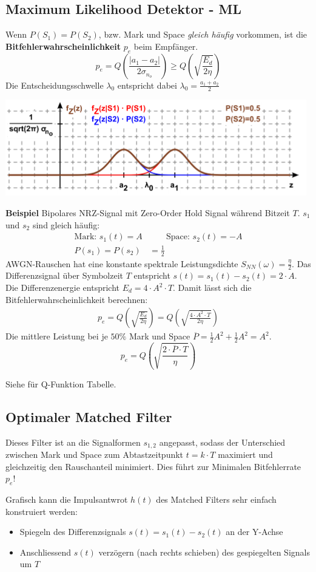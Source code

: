 \subsection{Maximum Likelihood Detektor - ML}
 Wenn $P(S_1) = P(S_2)$, bzw. Mark und Space \textit{gleich häufig} vorkommen, ist die \textbf{Bitfehlerwahrscheinlichkeit} $p_e$ beim Empfänger.
\[
p_e = Q\left(\frac{|a_1 - a_2|}{2\sigma_{n_o}}\right) \geq Q\left(\sqrt{\frac{E_d}{2\eta}}\right)
\]
Die Entscheidungsschwelle $\lambda_0$ entspricht dabei $\lambda_0 = \frac{a_1 + a_2}{2}$
\begin{center}
	\includegraphics[width=0.8\columnwidth]{Images/ml}
\end{center}
\noindent\textbf{Beispiel} Bipolares NRZ-Signal mit Zero-Order Hold Signal während Bitzeit $T$. $s_1$ und $s_2$ sind gleich häufig:\\
\begin{align*}
	\text{Mark: } s_1(t) = A &\qquad \text{Space: } s_2(t) = -A\\
	P(s_1) = P(s_2) &= \frac{1}{2}
\end{align*}
AWGN-Rauschen hat eine konstante spektrale Leistungsdichte $S_{NN}(\omega) = \frac{\eta}{2}$. Das Differenzsignal über Symbolzeit $T$ entspricht $s(t) = s_1(t) - s_2(t) = 2\cdot A$. Die Differenzenergie entspricht $E_d = 4\cdot A^2\cdot T$. Damit lässt sich die Bitfehlerwahrscheinlichkeit berechnen:
\begin{align*}
	p_e = Q\left(\sqrt{\frac{E_d}{2\eta}}\right) = Q\left(\sqrt{\frac{4\cdot A^2 \cdot T}{2\eta}}\right)
\end{align*}
Die mittlere Leistung bei je $50\%$ Mark und Space $\overline{P} = \frac{1}{2}A^2 + \frac{1}{2}A^2 = A^2$.
\[
p_e = Q\left(\sqrt{\frac{2\cdot \overline{P} \cdot T}{\eta}}\right)
\]

Siehe  für Q-Funktion Tabelle.

\subsection{Optimaler Matched Filter}
Dieses Filter ist an die Signalformen $s_{1,2}$ angepasst, sodass der Unterschied zwischen Mark und Space zum Abtastzeitpunkt $t =k\cdot T$ maximiert und gleichzeitig den Rauschanteil minimiert. Dies führt zur Minimalen Bitfehlerrate $p_e$!

Grafisch kann die Impulsantwrot $h(t)$ des Matched Filters sehr einfach konstruiert werden:
\begin{itemize}[nosep]
	\item Spiegeln des Differenzsignals $s(t) = s_1(t) - s_2(t)$ an der Y-Achse
	\item Anschliessend $s(t)$ verzögern (nach rechts schieben) des gespiegelten Signals um $T$
\end{itemize}